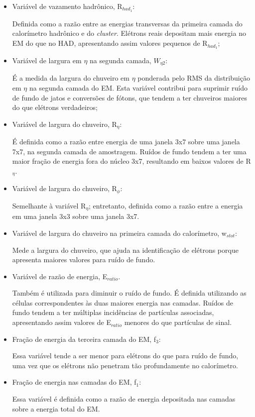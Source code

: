 \begin{itemize}
  \item Variável de vazamento hadrônico, R${_{had_1}}$:

  Definida como a razão entre as energias transversas da primeira camada do calorímetro hadrônico e do \emph{cluster}. Elétrons reais depositam mais energia no EM do que no HAD, apresentando assim valores pequenos de R${_{had_1}}$;

  \item Variável de largura em $\eta$ na segunda camada, ${W_{\eta 2}}$:

  É a medida da largura do chuveiro em $\eta$ ponderada pelo \ac{RMS} da distribuição em $\eta$ na segunda camada do EM. Esta variável contribui para suprimir ruído de fundo de jatos e conversões de fótons, que tendem a ter chuveiros maiores do que elétrons verdadeiros;

  \item Variável de largura do chuveiro, R${_\eta}$:

  É definida como a razão entre energia de uma janela 3x7 sobre uma janela 7x7, na segunda camada de amostragem.  Ruídos de fundo tendem a ter uma maior fração de energia fora do núcleo 3x7, resultando em baixos valores de R${_\eta}$.

  \item Variável de largura do chuveiro, R${_\phi}$:

  Semelhante à variável R${_\eta}$; entretanto, definida como a razão entre a energia em uma janela 3x3 sobre uma janela 3x7.

  \item Variável de largura do chuveiro na primeira camada do calorímetro, w${_{stot}}$:

  Mede a largura do chuveiro, que ajuda na identificação de elétrons porque apresenta maiores valores para ruído de fundo.

  \item Variável de razão de energia, E${_{ratio}}$.

  Também é utilizada para diminuir o ruído de fundo. É definida utilizando as células correspondentes às duas maiores energia nas camadas. Ruídos de fundo tendem a ter múltiplas incidências de partículas associadas, apresentando assim valores de E${_{ratio}}$ menores do que partículas de sinal.

  \item Fração de energia da terceira camada do EM, f${_3}$:

  Essa variável tende a ser menor para elétrons do que para ruído de fundo, uma vez que os elétrons não penetram tão profundamente no calorímetro.

  \item Fração de energia nas camadas do EM, f${_1}$:

  Essa variável é definida como a razão de energia depositada nas camadas sobre a energia total do EM.

\end{itemize}

